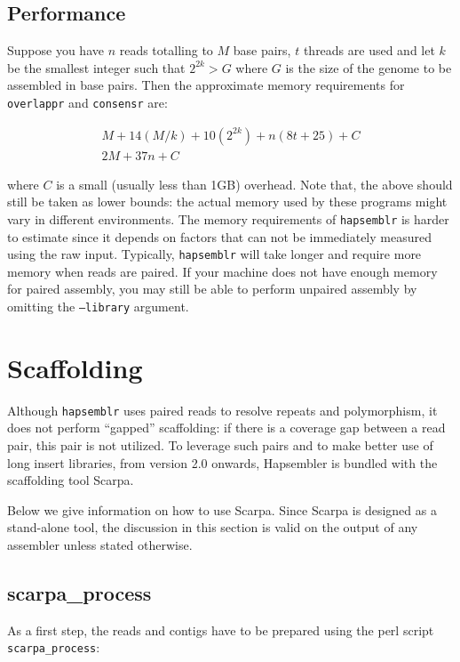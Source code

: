 \documentclass[12pt,a4paper]{report}
\newcommand{\hapversion}{2.0}
\begin{document}
\subsection{Performance}

Suppose you have $n$ reads totalling to $M$ base pairs, $t$ threads are used and let $k$ be the smallest integer such that $2^{2k}>G$ where $G$ is the size of the genome to be assembled in base pairs. Then the approximate memory requirements for \texttt{overlappr} and \texttt{consensr} are:

\begin{eqnarray}
M + 14(M/k) + 10(2^{2k}) + n(8t + 25) + C \\
2M + 37n + C
\end{eqnarray}

where $C$ is a small (usually less than 1GB) overhead. Note that, the above should still be taken as lower bounds: the actual memory used by these programs might vary in different environments. The memory requirements of \texttt{hapsemblr} is harder to estimate since it depends on factors that can not be immediately measured using the raw input. Typically, \texttt{hapsemblr} will take longer and require more memory when reads are paired. If your machine does not have enough memory for paired assembly, you may still be able to perform unpaired assembly by omitting the \texttt{--library} argument.

\section{Scaffolding}
\label{scaff}

Although \texttt{hapsemblr} uses paired reads to resolve repeats and polymorphism, it does not perform ``gapped'' scaffolding: if there is a coverage gap between a read pair, this pair is not utilized. To leverage such pairs and to make better use of long insert libraries, from version \hapversion{} onwards, Hapsembler is bundled with the scaffolding tool Scarpa. 

Below we give information on how to use Scarpa. Since Scarpa is designed as a stand-alone tool, the discussion in this section is valid on the output of any assembler unless stated otherwise.

\subsection{scarpa\_process}

As a first step, the reads and contigs have to be prepared using the perl script \texttt{scarpa\_process}:
\end{document}
